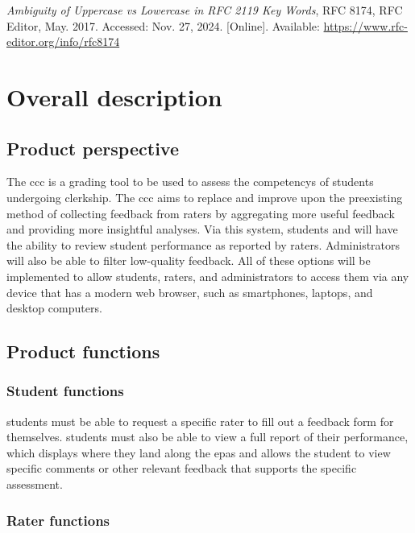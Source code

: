 \documentclass[letterpaper,article,oneside]{memoir}
\begin{document}
\textit{Ambiguity of Uppercase vs Lowercase in RFC 2119 Key Words}, RFC 8174, RFC Editor, May. 2017. Accessed: Nov. 27, 2024. [Online]. Available: \url{https://www.rfc-editor.org/info/rfc8174}

\chapter{Overall description}

\section{Product perspective}

The \gls{ccc} is a grading tool to be used to assess the \glspl{competency} of \glspl{student} undergoing clerkship.
The \gls{ccc} aims to replace and improve upon the preexisting method of collecting feedback from \glspl{rater} by aggregating more useful feedback and providing more insightful analyses.
Via this system, \glspl{student} and  will have the ability to review student performance as reported by \glspl{rater}.
Administrators will also be able to filter low-quality feedback.
All of these options will be implemented to allow \glspl{student}, \glspl{rater}, and administrators to access them via any device that has a modern web browser, such as smartphones, laptops, and desktop computers.

\section{Product functions}

\subsection{Student functions}

\Glspl{student} must be able to request a specific \gls{rater} to fill out a \gls{feedback form} for themselves.
\Glspl{student} must also be able to view a full report of their performance, which displays where they land along the \glspl{epa} and allows the student to view specific comments or other relevant feedback that supports the specific assessment.

\subsection{Rater functions}
\end{document}
